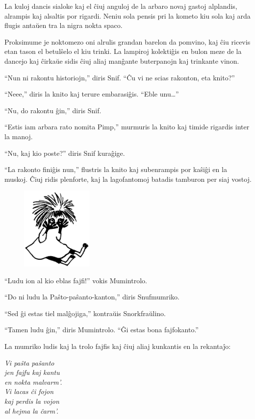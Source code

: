 La kuloj dancis sialoke kaj el ĉiuj anguloj de la arbaro novaj gastoj alplandis, alrampis kaj alsaltis por rigardi. Neniu sola pensis pri la kometo kiu sola kaj arda flugis antaŭen tra la nigra nokta spaco.

Proksimume je noktomezo oni alrulis grandan barelon da pomvino, kaj ĉiu ricevis etan tason el betulŝelo el kiu trinki. La lampiroj kolektiĝis en bulon meze de la dancejo kaj ĉirkaŭe sidis ĉiuj aliaj manĝante buterpanojn kaj trinkante vinon.

``Nun ni rakontu historiojn,'' diris Snif. ``Ĉu vi ne scias rakonton, eta knito?''

``Neee,'' diris la knito kaj terure embarasiĝis. ``Eble unu{\ldots}''

``Nu, do rakontu ĝin,'' diris Snif.

``Estis iam arbara rato nomita Pimp,'' murmuris la knito kaj timide rigardis inter la manoj.

``Nu, kaj kio poste?'' diris Snif kuraĝige.

``La rakonto finiĝis nun,'' flustris la knito kaj subenrampis por kaŝiĝi en la muskoj. Ĉiuj ridis plenforte, kaj la lagofantomoj batadis tamburon per siaj vostoj.

\begin{figure}[htbp]
\centering
\includegraphics[width=100pt,height=116pt]{6-8.png}
\caption{}
\label{6-8}
\end{figure}

``Ludu ion al kio eblas fajfi!'' vokis Mumintrolo.

``Do ni ludu la Paŝto-paŝanto-kanton,'' diris Snufmumriko.

``Sed ĝi estas tiel malĝojiga,'' kontraŭis Snorkfraŭlino.

``Tamen ludu ĝin,'' diris Mumintrolo. ``Ĝi estas bona fajfokanto.''

La mumriko ludis kaj la trolo fajfis kaj ĉiuj aliaj kunkantis en la rekantaĵo:

\begin{center}\itshape Vi paŝta paŝanto\\
jen fajfu kaj kantu\\
en nokta malvarm'.\\
Vi lacas ĉi fojon\\
kaj perdis la vojon\\
al hejma la ĉarm'.\\\end{center}

